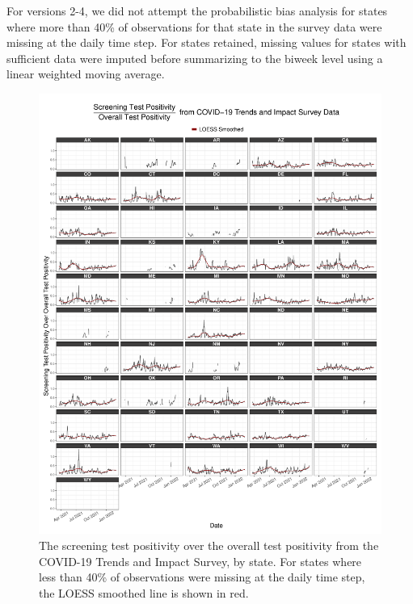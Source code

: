 \documentclass[12pt,twoside]{smiththesis}
\begin{document}
For versions 2-4, we did not attempt the probabilistic bias analysis for states where more than 40\% of observations for that state in the survey data were missing at the daily time step. For states retained, missing values for states with sufficient data were imputed before summarizing to the biweek level using a linear weighted moving average.
\begin{figure}
\includegraphics[width=1\linewidth]{figure/ctis_beta_states} \caption{\label{fig:statectis}The screening test positivity over the overall test positivity from the COVID-19 Trends and Impact Survey, by state. For states where less than 40\% of observations were missing at the daily time step, the LOESS smoothed line is shown in red.}\label{fig:unnamed-chunk-73}
\end{figure}
\end{document}
